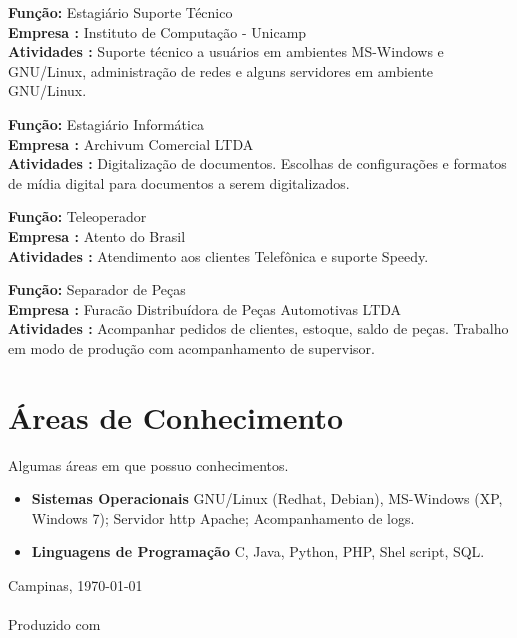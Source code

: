 \documentclass[a4paper]{article}
\begin{document}
\begin{CV}

\item[Desde 07/2010] \textbf{Função:} Estagiário Suporte Técnico
\\ \textbf{Empresa :} Instituto de Computação - Unicamp
\\ \textbf{Atividades :} Suporte técnico a usuários em ambientes MS-Windows e GNU/Linux, administração de redes e alguns  
servidores em ambiente GNU/Linux.

\item[01/2010--06/2010] \textbf{Função:} Estagiário Informática
\\ \textbf{Empresa :} Archivum Comercial LTDA
\\ \textbf{Atividades :} Digitalização de documentos. Escolhas de configurações e formatos de mídia digital para documentos a serem digitalizados.

\item[05/2007--07/2009] \textbf{Função:} Teleoperador
\\ \textbf{Empresa :} Atento do Brasil
\\ \textbf{Atividades :} Atendimento aos clientes Telefônica e suporte Speedy.

\item[09/2004--12/2006] \textbf{Função:} Separador de Peças
\\ \textbf{Empresa :} Furacão Distribuídora de Peças Automotivas LTDA
\\ \textbf{Atividades :} Acompanhar pedidos de clientes, estoque, saldo de peças. Trabalho em modo de produção com acompanhamento de supervisor.

\end{CV}

\section{Áreas de Conhecimento}
Algumas áreas em que possuo conhecimentos.
\begin{itemize}
	\item \textbf{Sistemas Operacionais} GNU/Linux (Redhat, Debian), MS-Windows (XP, Windows 7); Servidor http Apache; Acompanhamento de logs.
	\item \textbf{Linguagens de Programação} C, Java, Python, PHP, Shel script, SQL.
\end{itemize}
\vspace{2\baselineskip}
\noindent Campinas, \today
\\
\\Produzido com \small \LaTeXe
\end{document}
